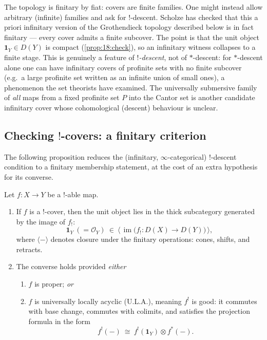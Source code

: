 \begin{remark}
\label{rmk:18:finitary}
The topology is finitary by fiat: covers are finite families. One might instead
allow arbitrary (infinite) families and ask for $!$-descent. Scholze has checked
that this a priori infinitary version of the Grothendieck topology described below
is in fact finitary --- every cover admits a finite subcover. The point is that the
unit object $\mathbf 1_Y\in D(Y)$ is compact (\cref{prop:18:check}), so an
infinitary witness collapses to a finite stage. This is genuinely a feature of
\emph{$!$-descent}, not of $*$-descent: for $*$-descent alone one can have
infinitary covers of profinite sets with no finite subcover (e.g.\ a large
profinite set written as an infinite union of small ones), a phenomenon the set
theorists have examined. The universally submersive family of \emph{all} maps from
a fixed profinite set $P$ into the Cantor set is another candidate infinitary
cover whose cohomological (descent) behaviour is unclear.
\end{remark}

\subsection{Checking \texorpdfstring{$!$}{!}-covers: a finitary criterion}
\label{subsec:18:checking}

The following proposition reduces the (infinitary, $\infty$-categorical)
$!$-descent condition to a finitary membership statement, at the cost of an extra
hypothesis for its converse.

\begin{proposition}
\label{prop:18:check}
Let $f\colon X\to Y$ be a $!$-able map.
\begin{enumerate}
\item If $f$ is a $!$-cover, then the unit object lies in the thick subcategory
generated by the image of $f_!$:
\begin{equation}
\label{eq:18:unit-in-thick}
\mathbf 1_Y\ (=\mathcal O_Y)\ \in\ \bigl\langle\,\operatorname{im}\bigl(f_!\colon D(X)\to D(Y)\bigr)\,\bigr\rangle,
\end{equation}
where $\langle-\rangle$ denotes closure under the finitary operations: cones,
shifts, and retracts.
\item The converse holds provided \emph{either}
\begin{enumerate}
\item[\textup{(a)}] $f$ is proper; \emph{or}
\item[\textup{(b)}] $f$ is universally locally acyclic \textup{(U.L.A.)}, meaning
$f^!$ is good: it commutes with base change, commutes with colimits, and satisfies
the projection formula in the form
\begin{equation*}
f^!(-)\ \cong\ f^!(\mathbf 1_Y)\otimes f^*(-).
\end{equation*}
\end{enumerate}
\end{enumerate}
\end{proposition}

